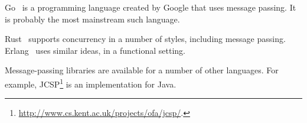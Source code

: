 Go~\cite{go} is a programming language created by Google that uses message
passing.  It is probably the most mainstream such language.


Rust~\cite{rust} supports concurrency in a number of styles, including message
  passing.
Erlang~\cite{erlang} uses similar ideas, in a functional setting.

Message-passing libraries are available for a number of other languages.  For
example, JCSP\footnote{\url{http://www.cs.kent.ac.uk/projects/ofa/jcsp/}.} is
an implementation  for Java.








\exercises








